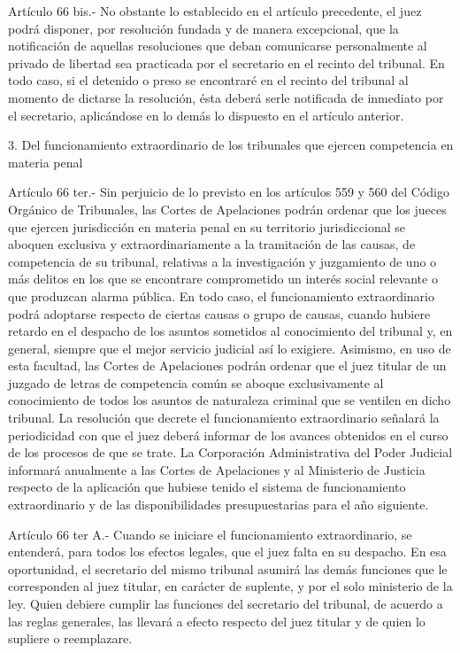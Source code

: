     Artículo 66 bis.- No obstante lo establecido en el artículo precedente, el juez podrá disponer, por resolución fundada y de manera excepcional, que la notificación de aquellas resoluciones que deban comunicarse personalmente al privado de libertad sea practicada por el secretario en el recinto del tribunal.
    En todo caso, si el detenido o preso se encontraré en el recinto del tribunal al momento de dictarse la resolución, ésta deberá serle notificada de inmediato por el secretario, aplicándose en lo demás lo dispuesto en el artículo anterior.

      3. Del funcionamiento extraordinario de los
tribunales que ejercen competencia en materia penal

    Artículo 66 ter.- Sin perjuicio de lo previsto en los artículos 559 y 560 del Código Orgánico de Tribunales, las Cortes de Apelaciones podrán ordenar que los jueces que ejercen jurisdicción en materia penal en su territorio jurisdiccional se aboquen exclusiva y extraordinariamente a la tramitación de las causas, de competencia de su tribunal, relativas a la investigación y juzgamiento de uno o más delitos en los que se encontrare comprometido un interés social relevante o que produzcan alarma pública.
    En todo caso, el funcionamiento extraordinario podrá adoptarse respecto de ciertas causas o grupo de causas, cuando hubiere retardo en el despacho de los asuntos sometidos al conocimiento del tribunal y, en general, siempre que el mejor servicio judicial así lo exigiere.
    Asimismo, en uso de esta facultad, las Cortes de Apelaciones podrán ordenar que el juez titular de un juzgado de letras de competencia común se aboque exclusivamente al conocimiento de todos los asuntos de naturaleza criminal que se ventilen en dicho tribunal.
    La resolución que decrete el funcionamiento extraordinario señalará la periodicidad con que el juez deberá informar de los avances obtenidos en el curso de los procesos de que se trate.
    La Corporación Administrativa del Poder Judicial informará anualmente a las Cortes de Apelaciones y al Ministerio de Justicia respecto de la aplicación que hubiese tenido el sistema de funcionamiento extraordinario y de las disponibilidades presupuestarias para el año siguiente.

    Artículo 66 ter A.- Cuando se iniciare el funcionamiento extraordinario, se entenderá, para todos los efectos legales, que el juez falta en su despacho. En esa oportunidad, el secretario del mismo tribunal asumirá las demás funciones que le corresponden al juez titular, en carácter de suplente, y por el solo ministerio de la ley.
    Quien debiere cumplir las funciones del secretario del tribunal, de acuerdo a las reglas generales, las llevará a efecto respecto del juez titular y de quien lo supliere o reemplazare.

